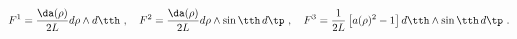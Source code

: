 \begin{equation}
\label{F}
  F^1 = \frac{\da(\rho)}{2L} d\rho \wedge d \tth~,\quad
  F^2 = \frac{\da(\rho)}{2L} d\rho \wedge \sin\tth \,d\tp~,\quad
  F^3 = \frac1{2L} \left[a(\rho)^2-1\right] d\tth \wedge \sin\tth \, d\tp~.
\end{equation}

